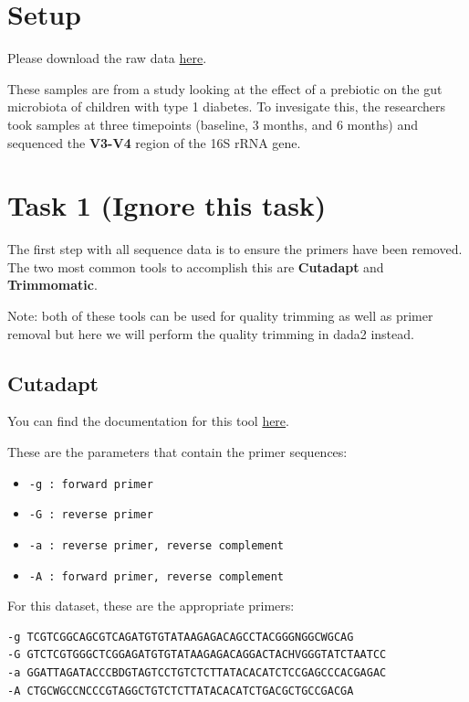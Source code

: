 \documentclass[
]{book}
\providecommand{\tightlist}{%
  \setlength{\itemsep}{0pt}\setlength{\parskip}{0pt}}
\begin{document}
\hypertarget{setup}{%
\section{Setup}\label{setup}}

Please download the raw data \href{https://www.dropbox.com/sh/1oy9upgzxlsra9y/AAANkbCj36lvP6vEQucE7fYna?dl=0}{here}.

These samples are from a study looking at the effect of a prebiotic on the gut microbiota of children with type 1 diabetes. To invesigate this, the researchers took samples at three timepoints (baseline, 3 months, and 6 months) and sequenced the \textbf{V3-V4} region of the 16S rRNA gene.

\hypertarget{task-1-ignore-this-task}{%
\section{Task 1 (Ignore this task)}\label{task-1-ignore-this-task}}

The first step with all sequence data is to ensure the primers have been removed. The two most common tools to accomplish this are \textbf{Cutadapt} and \textbf{Trimmomatic}.

Note: both of these tools can be used for quality trimming as well as primer removal but here we will perform the quality trimming in dada2 instead.

\hypertarget{cutadapt-1}{%
\subsection{Cutadapt}\label{cutadapt-1}}

You can find the documentation for this tool \href{https://cutadapt.readthedocs.io/en/stable/}{here}.

These are the parameters that contain the primer sequences:

\begin{itemize}
\tightlist
\item
  \texttt{-g\ :\ forward\ primer}
\item
  \texttt{-G\ :\ reverse\ primer}
\item
  \texttt{-a\ :\ reverse\ primer,\ reverse\ complement}
\item
  \texttt{-A\ :\ forward\ primer,\ reverse\ complement}
\end{itemize}

For this dataset, these are the appropriate primers:

\begin{verbatim}
-g TCGTCGGCAGCGTCAGATGTGTATAAGAGACAGCCTACGGGNGGCWGCAG
-G GTCTCGTGGGCTCGGAGATGTGTATAAGAGACAGGACTACHVGGGTATCTAATCC
-a GGATTAGATACCCBDGTAGTCCTGTCTCTTATACACATCTCCGAGCCCACGAGAC
-A CTGCWGCCNCCCGTAGGCTGTCTCTTATACACATCTGACGCTGCCGACGA
\end{verbatim}
\end{document}

